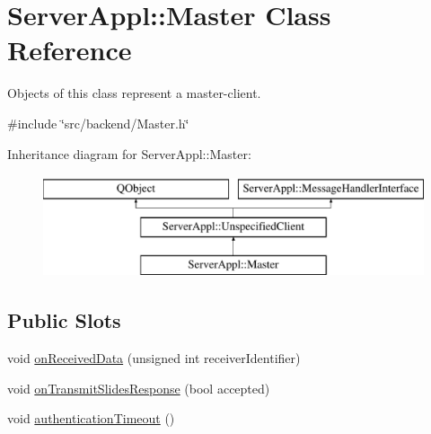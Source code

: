 \hypertarget{class_server_appl_1_1_master}{}\section{Server\+Appl\+:\+:Master Class Reference}
\label{class_server_appl_1_1_master}


Objects of this class represent a master-\/client.  




{\ttfamily \#include \char`\"{}src/backend/\+Master.\+h\char`\"{}}

Inheritance diagram for Server\+Appl\+:\+:Master\+:\begin{figure}[H]
\begin{center}
\leavevmode
\includegraphics[height=3.000000cm]{class_server_appl_1_1_master}
\end{center}
\end{figure}
\subsection*{Public Slots}
\begin{DoxyCompactItemize}
\item 
void \hyperlink{class_server_appl_1_1_master_aa3eec24a3c9508726b133b21da9fd6fe}{on\+Received\+Data} (unsigned int receiver\+Identifier)
\item 
void \hyperlink{class_server_appl_1_1_master_a329d423c033208c46b88a0a3ef192ec5}{on\+Transmit\+Slides\+Response} (bool accepted)
\item 
void \hyperlink{class_server_appl_1_1_master_a19471eed9ec25d99f0dd31f649dc0c1b}{authentication\+Timeout} ()
\end{DoxyCompactItemize}
